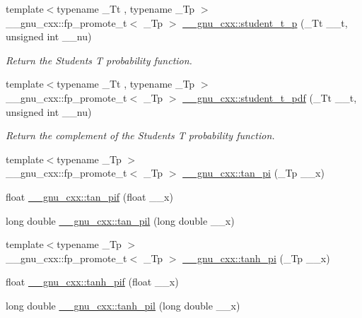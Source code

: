 \begin{DoxyCompactItemize}
\item 
{\footnotesize template$<$typename \+\_\+\+Tt , typename \+\_\+\+Tp $>$ }\\\+\_\+\+\_\+gnu\+\_\+cxx\+::fp\+\_\+promote\+\_\+t$<$ \+\_\+\+Tp $>$ \hyperlink{group__mathsf__gnu_ga5a84386b009ac57a726d5d0314fdf7ce}{\+\_\+\+\_\+gnu\+\_\+cxx\+::student\+\_\+t\+\_\+p} (\+\_\+\+Tt \+\_\+\+\_\+t, unsigned int \+\_\+\+\_\+nu)
\begin{DoxyCompactList}\small\item\em Return the Students T probability function. \end{DoxyCompactList}\item 
{\footnotesize template$<$typename \+\_\+\+Tt , typename \+\_\+\+Tp $>$ }\\\+\_\+\+\_\+gnu\+\_\+cxx\+::fp\+\_\+promote\+\_\+t$<$ \+\_\+\+Tp $>$ \hyperlink{group__mathsf__gnu_ga95a4c03cf0a8104e9a15a35acfe5fb3a}{\+\_\+\+\_\+gnu\+\_\+cxx\+::student\+\_\+t\+\_\+pdf} (\+\_\+\+Tt \+\_\+\+\_\+t, unsigned int \+\_\+\+\_\+nu)
\begin{DoxyCompactList}\small\item\em Return the complement of the Students T probability function. \end{DoxyCompactList}\item 
{\footnotesize template$<$typename \+\_\+\+Tp $>$ }\\\+\_\+\+\_\+gnu\+\_\+cxx\+::fp\+\_\+promote\+\_\+t$<$ \+\_\+\+Tp $>$ \hyperlink{group__mathsf__gnu_ga12855bd62fe6a955ef0d1d5e92c85ba9}{\+\_\+\+\_\+gnu\+\_\+cxx\+::tan\+\_\+pi} (\+\_\+\+Tp \+\_\+\+\_\+x)
\item 
float \hyperlink{group__mathsf__gnu_gaab32e2d76da811451e84232320ddf80c}{\+\_\+\+\_\+gnu\+\_\+cxx\+::tan\+\_\+pif} (float \+\_\+\+\_\+x)
\item 
long double \hyperlink{group__mathsf__gnu_ga3546906a5bb8f128c893dddef72e2f20}{\+\_\+\+\_\+gnu\+\_\+cxx\+::tan\+\_\+pil} (long double \+\_\+\+\_\+x)
\item 
{\footnotesize template$<$typename \+\_\+\+Tp $>$ }\\\+\_\+\+\_\+gnu\+\_\+cxx\+::fp\+\_\+promote\+\_\+t$<$ \+\_\+\+Tp $>$ \hyperlink{group__mathsf__gnu_ga8729ffd5acf3266315e9dac1b5a9b3a6}{\+\_\+\+\_\+gnu\+\_\+cxx\+::tanh\+\_\+pi} (\+\_\+\+Tp \+\_\+\+\_\+x)
\item 
float \hyperlink{group__mathsf__gnu_gab6cbfb582127f997ad9a198903d08889}{\+\_\+\+\_\+gnu\+\_\+cxx\+::tanh\+\_\+pif} (float \+\_\+\+\_\+x)
\item 
long double \hyperlink{group__mathsf__gnu_ga4bc71ee5cf3df2ba35e6504027e5c6c6}{\+\_\+\+\_\+gnu\+\_\+cxx\+::tanh\+\_\+pil} (long double \+\_\+\+\_\+x)

\end{DoxyCompactItemize}
